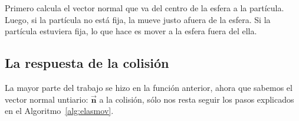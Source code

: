 
Primero calcula el vector normal que va del centro de la esfera a la partícula.
Luego, si la partícula no está fija, la mueve justo afuera de la esfera.
Si la partícula estuviera fija, lo que hace es mover a la esfera fuera del ella.

\subsection{La respuesta de la colisión}
La mayor parte del trabajo se hizo en la función anterior, ahora que sabemos el vector normal untiario: $\vec{\textbf{n}}$ a la colisión, sólo nos resta seguir los pasos explicados en el Algoritmo~\ref{alg:elasmov}.

